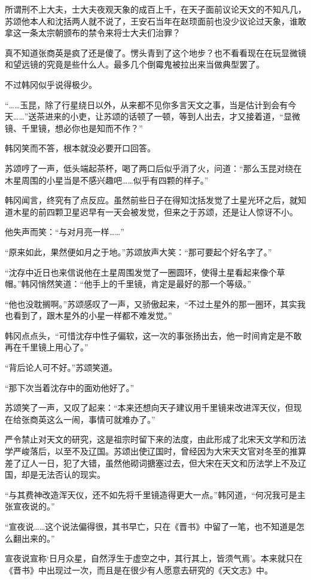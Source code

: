 所谓刑不上大夫，士大夫夜观天象的成百上千，在天子面前议论天文的不知凡几，苏颂他本人和沈括两人就不说了，王安石当年在赵顼面前也没少议论过天象，谁敢拿这一条太宗朝颁布的禁令来将士大夫们治罪？

真不知道张商英是疯了还是傻了。愣头青到了这个地步？也不看看现在在玩显微镜和望远镜的究竟是些什么人。最多几个倒霉鬼被拉出来当做典型罢了。

不过韩冈似乎说得极少。

“……玉昆，除了行星绕日以外，从来都不见你多言天文之事，当是估计到会有今天……”送茶进来的小吏，让苏颂的话顿了一顿，等到人出去，才又接着道，“显微镜、千里镜，想必你也是知而不作？”

韩冈笑而不答，根本就没必要开口回答。

苏颂哼了一声，低头端起茶杯，喝了两口后似乎消了火，问道：“那么玉昆对绕在木星周围的小星当是不感兴趣吧……似乎有四颗的样子。”

韩冈闻言，终究有了点反应。虽然前些日子在得知沈括发觉了土星光环之后，就知道木星的前四颗卫星迟早有一天会被发觉，但来之于苏颂，还是让人惊讶不小。

他失声而笑：“与对月亮一样……”

“原来如此，果然便如月之于地。”苏颂放声大笑：“那可要起个好名字了。”

“沈存中近日也来信说他在土星周围发觉了一圈圆环，使得土星看起来像个草帽。”韩冈悄然笑道：“他手上的千里镜，肯定是最好的那一个等级。”

“他也没耽搁啊。”苏颂感叹了一声，又骄傲起来，“不过土星外的那一圈环，其实我也看到了，跟木星外的小星一样都不难发觉。”

韩冈点点头，“可惜沈存中性子偏软，这一次的事张扬出去，他一时间肯定是不敢再在千里镜上用心了。”

“背后论人可不好。”苏颂笑道。

“那下次当着沈存中的面劝他好了。”

苏颂笑了一声，又叹了起来：“本来还想向天子建议用千里镜来改进浑天仪，但现在给张商英这么一闹，事情可就难办了。”

严令禁止对天文的研究，这是祖宗时留下来的法度，由此形成了北宋天文学和历法学严峻落后，以至不及辽国。苏颂出使辽国时，曾经因为大宋天文官对冬至的推算差了辽人一日，犯了大错，虽然他砌词搪塞过去，但大宋在天文和历法学上不及辽国，却是无法否认的现实。

“与其费神改造浑天仪，还不如先将千里镜造得更大一点。”韩冈道，“何况我可是主张宣夜说的。”

“宣夜说……这个说法偏得很，其书早亡，只在《晋书》中留了一笔，也不知道是怎么翻出来的。”

宣夜说宣称‘日月众星，自然浮生于虚空之中，其行其上，皆须气焉’。本来就只在《晋书》中出现过一次，而且是在很少有人愿意去研究的《天文志》中。

